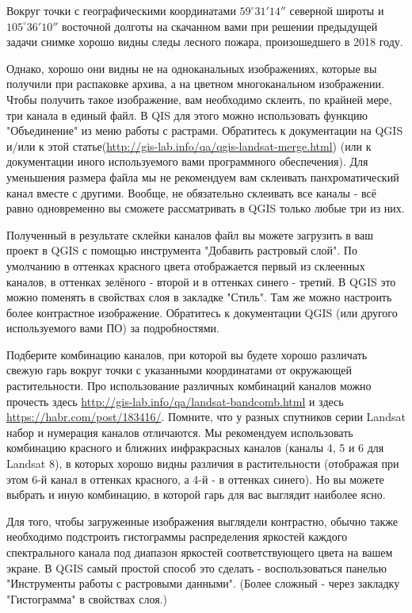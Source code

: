 
Вокруг точки с географическими координатами $59^{\circ}31'14''$ северной широты и $105^{\circ}36'10''$ 
восточной долготы на скачанном вами при решении предыдущей задачи снимке хорошо видны следы лесного пожара, 
произошедшего в 2018 году.

Однако, хорошо они видны не на одноканальных изображениях, которые вы получили при распаковке архива, 
а на цветном многоканальном изображении. Чтобы получить такое изображение, вам необходимо склеить, 
по крайней мере, три канала в единый файл. В QIS для этого можно использовать функцию "Объединение" из меню 
работы с растрами. Обратитесь к документации на QGIS и/или к этой статье(\url{http://gis-lab.info/qa/qgis-landsat-merge.html}) (или к документации иного используемого вами программного обеспечения). Для уменьшения размера файла мы не рекомендуем вам склеивать панхроматический канал вместе с другими. Вообще, не обязательно склеивать все каналы - всё равно одновременно вы сможете рассматривать в QGIS только любые три из них.

Полученный в результате склейки каналов файл вы можете загрузить в ваш проект в QGIS с помощью инструмента "Добавить 
растровый слой". По умолчанию в оттенках красного цвета отображается первый из склеенных каналов, в оттенках зелёного - второй и в оттенках синего - третий. В QGIS это можно поменять в свойствах слоя в закладке "Стиль". Там же можно настроить более контрастное изображение. Обратитесь к документации QGIS (или другого используемого вами ПО) за подробностями.

Подберите комбинацию каналов, при которой вы будете хорошо различать свежую гарь вокруг точки с 
указанными координатами от окружающей растительности. Про использование различных комбинаций каналов 
можно прочесть здесь \url{http://gis-lab.info/qa/landsat-bandcomb.html} и здесь \url{https://habr.com/post/183416/}. Помните, что у разных спутников серии Landsat набор и нумерация каналов отличаются. Мы рекомендуем использовать комбинацию красного и ближних инфракрасных каналов (каналы 4, 5 и 6 для Landsat 8), в которых хорошо видны различия в растительности (отображая при этом 6-й канал в оттенках красного, а 4-й - в оттенках синего). Но вы можете выбрать и иную комбинацию, в которой гарь для вас выглядит наиболее ясно.

Для того, чтобы загруженные изображения выглядели контрастно, обычно также необходимо подстроить гистограммы распределения яркостей каждого спектрального канала под диапазон яркостей соответствующего цвета на вашем экране. В QGIS самый простой способ это сделать - воспользоваться панелью "Инструменты работы с растровыми данными". (Более сложный - через закладку "Гистограмма" в свойствах слоя.)

